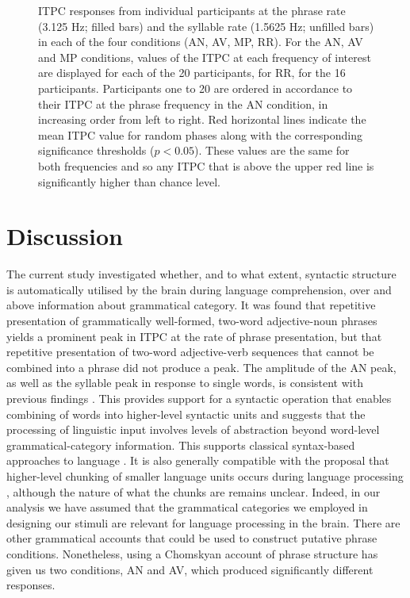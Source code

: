 \documentclass[11pt,a4wide]{article}
\newcommand{\citet}[1]{\cite{#1}}
\begin{document}
\begin{figure}[tbhp]

\caption{ITPC responses from individual participants at the phrase
  rate (3.125 Hz; filled bars) and the syllable rate (1.5625 Hz;
  unfilled bars) in each of the four conditions (AN, AV, MP, RR). For
  the AN, AV and MP conditions, values of the ITPC at each frequency
  of interest are displayed for each of the 20 participants, for RR,
  for the 16 participants. Participants one to 20 are ordered in
  accordance to their ITPC at the phrase frequency in the AN
  condition, in increasing order from left to right. Red horizontal
  lines indicate the mean ITPC value for random phases along with the
  corresponding significance thresholds ($p<0.05$). These values are
  the same for both frequencies and so any ITPC that is above the
  upper red line is significantly higher than chance level.}
\label{fig:Fig3}
\end{figure}


\section*{Discussion}


The current study investigated whether, and to what extent, syntactic
structure is automatically utilised by the brain during language
comprehension, over and above information about grammatical
category. It was found that repetitive presentation of grammatically
well-formed, two-word adjective-noun phrases yields a prominent peak
in ITPC at the rate of phrase presentation, but that repetitive
presentation of two-word adjective-verb sequences that cannot be
combined into a phrase did not produce a peak. The amplitude of the AN
peak, as well as the syllable peak in response to single words, is
consistent with previous findings \citet{DingEtAl2017}. This provides
support for a syntactic operation that enables combining of words into
higher-level syntactic units and suggests that the processing of
linguistic input involves levels of abstraction beyond word-level
grammatical-category information. This supports classical syntax-based
approaches to language
\citet{BerwickEtAl2013,EveraertEtAl2015,Chomsky1995}. It is also
generally compatible with the proposal that higher-level chunking of
smaller language units occurs during language processing
\citet{ChristiansenChater2016}, although the nature of what the chunks
are remains unclear. Indeed, in our analysis we have assumed that the
grammatical categories we employed in designing our stimuli are
relevant for language processing in the brain. There are other
grammatical accounts that could be used to construct putative phrase
conditions. Nonetheless, using a Chomskyan account of phrase structure
has given us two conditions, AN and AV, which produced significantly
different responses.
\end{document}
